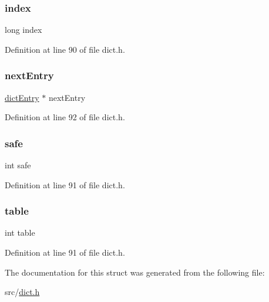 \subsubsection{\texorpdfstring{index}{index}}
{\footnotesize\ttfamily long index}



Definition at line 90 of file dict.\+h.

\mbox{\label{structdict_iterator_a21d7b69d1530abaedbfd8df260733769}} 
\subsubsection{\texorpdfstring{next\+Entry}{nextEntry}}
{\footnotesize\ttfamily \hyperlink{structdict_entry}{dict\+Entry} $\ast$ next\+Entry}



Definition at line 92 of file dict.\+h.

\mbox{\label{structdict_iterator_a3165c7b86c85463f7d64defedf6b0d43}} 
\subsubsection{\texorpdfstring{safe}{safe}}
{\footnotesize\ttfamily int safe}



Definition at line 91 of file dict.\+h.

\mbox{\label{structdict_iterator_a381b3daa303e1bdbac3a7b7000e0176c}} 
\subsubsection{\texorpdfstring{table}{table}}
{\footnotesize\ttfamily int table}



Definition at line 91 of file dict.\+h.



The documentation for this struct was generated from the following file\+:\begin{DoxyCompactItemize}
\item 
src/\hyperlink{dict_8h}{dict.\+h}\end{DoxyCompactItemize}
